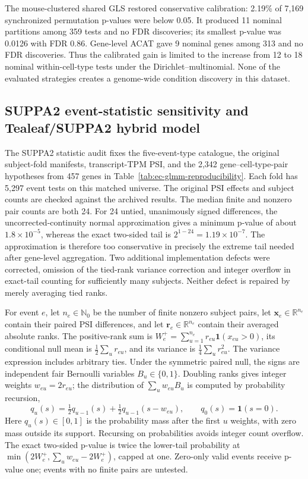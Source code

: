 \documentclass[11pt]{article}
\begin{document}
The mouse-clustered shared GLS restored conservative calibration: 2.19\% of 7,169 synchronized permutation p-values were below 0.05. It produced 11 nominal partitions among 359 tests and no FDR discoveries; its smallest p-value was 0.0126 with FDR 0.86. Gene-level ACAT gave 9 nominal genes among 313 and no FDR discoveries. Thus the calibrated gain is limited to the increase from 12 to 18 nominal within-cell-type tests under the Dirichlet--multinomial. None of the evaluated strategies creates a genome-wide condition discovery in this dataset.

\subsection*{SUPPA2 event-statistic sensitivity and Tealeaf/SUPPA2 hybrid model}

The SUPPA2 statistic audit fixes the five-event-type catalogue, the original subject-fold manifests, transcript-TPM PSI, and the 2,342 gene--cell-type-pair hypotheses from 457 genes in Table~\ref{tab:ec-glmm-reproducibility}. Each fold has 5,297 event tests on this matched universe. The original PSI effects and subject counts are checked against the archived results. The median finite and nonzero pair counts are both 24. For 24 untied, unanimously signed differences, the uncorrected-continuity normal approximation gives a minimum p-value of about \(1.8\times10^{-5}\), whereas the exact two-sided tail is \(2^{1-24}=1.19\times10^{-7}\). The approximation is therefore too conservative in precisely the extreme tail needed after gene-level aggregation. Two additional implementation defects were corrected, omission of the tied-rank variance correction and integer overflow in exact-tail counting for sufficiently many subjects. Neither defect is repaired by merely averaging tied ranks.

For event \(e\), let \(n_e\in\mathbb N_0\) be the number of finite nonzero subject pairs, let \(\bm x_e\in\mathbb R^{n_e}\) contain their paired PSI differences, and let \(\bm r_e\in\mathbb R^{n_e}\) contain their averaged absolute ranks. The positive-rank sum is \(W_e^+=\sum_{u=1}^{n_e}r_{eu}\mathbf1(x_{eu}>0)\), its conditional null mean is \(\tfrac12\sum_u r_{eu}\), and its variance is \(\tfrac14\sum_u r_{eu}^2\). The variance expression includes arbitrary ties. Under the symmetric paired null, the signs are independent fair Bernoulli variables \(B_u\in\{0,1\}\). Doubling ranks gives integer weights \(w_{eu}=2r_{eu}\); the distribution of \(\sum_u w_{eu}B_u\) is computed by probability recursion, \[q_u(s)=\tfrac12q_{u-1}(s)+\tfrac12q_{u-1}(s-w_{eu}),\qquad q_0(s)=\mathbf1(s=0).\] Here \(q_u(s)\in[0,1]\) is the probability mass after the first \(u\) weights, with zero mass outside its support. Recursing on probabilities avoids integer count overflow. The exact two-sided p-value is twice the lower-tail probability at \(\min(2W_e^+,\sum_u w_{eu}-2W_e^+)\), capped at one. Zero-only valid events receive p-value one; events with no finite pairs are untested.
\end{document}
